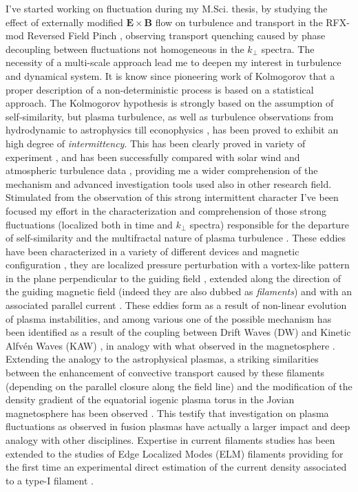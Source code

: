 \documentclass[12pt,a4paper]{article}
\begin{document}
I've started working on fluctuation during my M.Sci. thesis, by
studying the effect of externally modified $\mathbf{E}\times\mathbf{B}$
flow on turbulence and transport in the RFX-mod Reversed Field Pinch
\cite{Antoni:2000p3587}, observing transport quenching caused by
phase decoupling between fluctuations not homogeneous in the
$k_{\perp}$ spectra. The necessity of a multi-scale approach lead me to deepen my
interest in turbulence and dynamical system. It is know since
pioneering work of Kolmogorov \cite{Frisch:1996ue} that a proper
description of a non-deterministic process is based on a statistical
approach.  The Kolmogorov hypothesis is strongly based on the
assumption of self-similarity, but plasma turbulence, as well as turbulence observations from hydrodynamic to
astrophysics till econophysics \cite{Sornette:2006dt}, has been proved
to exhibit an high degree of \emph{intermittency}. This has been
clearly proved in variety of experiment
\cite{Antoni:2001p662,Vianello:2002p3579}, and has been successfully compared
with solar wind and atmospheric turbulence data
\cite{Carbone:2002p2809}, providing me a wider comprehension of the
mechanism and advanced investigation tools used also in other research
field. Stimulated from the observation of this strong intermittent
character I've been focused my effort in the characterization and
comprehension of those strong fluctuations (localized both in time and
$k_{\perp}$ spectra) responsible for the departure of self-similarity
and the multifractal nature of plasma turbulence
\cite{Bohr:1998fn}. These eddies have been characterized in a variety
of different devices and magnetic configuration
\cite{Spolaore:2009p4115,Vianello:2010p4670,Furno:2011cs,Spolaore:2015ij},
they are localized pressure perturbation with a vortex-like pattern in
the plane perpendicular to the guiding field \cite{Antoni:2006p3585},
extended along the direction of the guiding magnetic field (indeed
they are also dubbed as \emph{filaments})
and with an associated parallel current
\cite{Spolaore:2009p4115,Vianello:2010p4670}. These eddies form as a
result of non-linear evolution of plasma instabilities, and among
various one of the possible mechanism has been identified as a result
of the coupling between Drift Waves (DW) and Kinetic Alfv{\'e}n Waves
(KAW) \cite{Vianello:2010p4670}, in analogy with what observed in the
magnetosphere \cite{Martines:2009p4483,Sundkvist:2005is}. Extending
the analogy to the astrophysical plasmas, a striking similarities
between the enhancement of convective transport caused by these
filaments (depending on the parallel closure along the field line) and
the modification of the density gradient of the equatorial iogenic
plasma torus in the Jovian magnetosphere \cite{Frank:2002eu} has been
observed \cite{carralero:prl2015}. This testify that investigation on
plasma fluctuations as observed in fusion plasmas have actually a
larger impact and deep analogy with other disciplines. 
Expertise in
current filaments studies has been extended to the studies of Edge
Localized Modes (ELM)
filaments providing for the first time an experimental direct estimation of the
current density associated to a type-I filament
\cite{PhysRevLett.106.125002,Naulin:2011im,Muller:2011kj,Spolaore:2015tk}.
\end{document}
